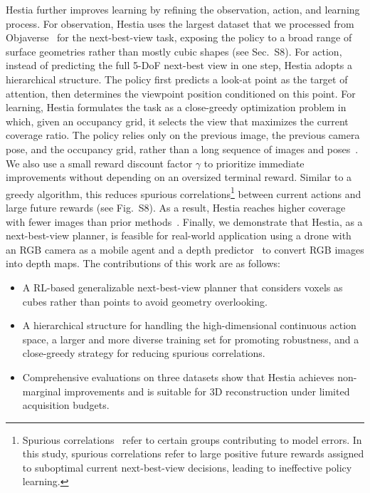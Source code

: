 Hestia further improves learning by refining the observation, action, and learning process. 
For observation, Hestia uses the largest dataset that we processed from Objaverse~\cite{Deitke_2023_CVPR, deitke2024objaverse} for the next-best-view task, exposing the policy to a broad range of surface geometries rather than mostly cubic shapes (see Sec.~S8). 
For action, instead of predicting the full 5-DoF next-best view in one step, Hestia adopts a hierarchical structure. 
The policy first predicts a look-at point as the target of attention, then determines the viewpoint position conditioned on this point. 
For learning, Hestia formulates the task as a close-greedy optimization problem in which, given an occupancy grid, it selects the view that maximizes the current coverage ratio. 
The policy relies only on the previous image, the previous camera pose, and the occupancy grid, rather than a long sequence of images and poses~\cite{peralta2020next, chen2024gennbv}. 
We also use a small reward discount factor \(\gamma\) to prioritize immediate improvements without depending on an oversized terminal reward. 
Similar to a greedy algorithm, this reduces spurious correlations\footnote{Spurious correlations~\cite{interpretation1971spurious, kim2024discovering} refer to certain groups contributing to model errors. In this study, spurious correlations refer to large positive future rewards assigned to suboptimal current next-best-view decisions, leading to ineffective policy learning.} between current actions and large future rewards (see Fig.~S8). 
As a result, Hestia reaches higher coverage with fewer images than prior methods~\cite{guedon2023macarons, jin2023neu, chen2024gennbv, peralta2020next}.
Finally, we demonstrate that Hestia, as a next-best-view planner, is feasible for real-world application using a drone with an RGB camera as a mobile agent and a depth predictor~\cite{duisterhof2024mast3r, wang2024dust3r} to convert RGB images into depth maps. 
The contributions of this work are as follows:
\begin{itemize}
\item A RL-based generalizable next-best-view planner that considers voxels as cubes rather than points to avoid geometry overlooking.
\item A hierarchical structure for handling the high-dimensional continuous action space, a larger and more diverse training set for promoting robustness, and a close-greedy strategy for reducing spurious correlations.
\item Comprehensive evaluations on three datasets show that Hestia achieves non-marginal improvements and is suitable for 3D reconstruction under limited acquisition budgets.
\end{itemize}

